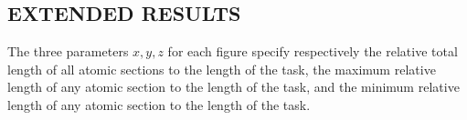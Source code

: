 \documentclass{sig-alternate}
\begin{document}
\subsection{EXTENDED RESULTS}
The three parameters $x,y,z$ for each figure specify respectively the relative total length of all atomic sections to the length of the task, the maximum relative length of any atomic section to the length of the task, and the minimum relative length of any atomic section to the length of the task.
\begin{figure}[htbp]
\centering
{}
\end{figure}
\end{document}
